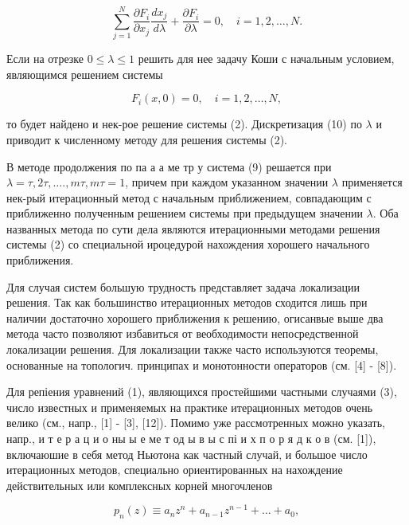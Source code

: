 \documentclass[10pt]{article}
\begin{document}
\[

\sum_{j=1}^{N} \frac{\partial F_{i}}{\partial x_{j}} \frac{d x_{j}}{d \lambda}+\frac{\partial F_{i}}{\partial \lambda}=0, \quad i=1,2, \ldots, N .

\]



Если на отрезке $0 \leqslant \lambda \leqslant 1$ решить для нее задачу Коши с начальным условием, являющимся решением системы



\[

F_{i}(x, 0)=0, \quad i=1,2, \ldots, N,

\]



то будет найдено и нек-рое решение системы (2). Дискретизация (10) по $\lambda$ и приводит к численному методу для решения системы (2).



В методе продолжения по па а а ме тр у система (9) решается при $\lambda=\tau, 2 \tau, \ldots ., m \tau, m \tau=1$, причем при каждом указанном значении $\lambda$ применяется нек-рый итерационный метод с начальным приближением, совпадающим с приближенно полученным решением системы при предыдущем значении $\lambda$. Оба названных метода по сути дела являются итерационными методами решения системы (2) со специальной ироцедурой нахождения хорошего начального приближения.



Для случая систем большую трудность представляет задача локализации решения. Так как большинство итерационных методов сходится лишь при наличии достаточно хорошего приближения к решению, огисанвые выше два метода часто позволяют избавиться от веобходимости непосредственной локализации решения. Для локализации также часто используются теоремы, основанные на топологич. принципах и монотонности операторов (см. [4] - [8]).



Для репіения уравнений (1), являющихся простейшими частными случаями (3), число известных и применяемых на практике итерационных методов очень велико (см., напр., [1] - [3], [12]). Помимо уже рассмотренных можно указать, напр., и т е р а ц и о ны ы е ме т од ы в ы с пі и х п о р я д к о в (см. [1]), включаюшие в себя метод Ньютона как частный случай, и большое число итерационных методов, специально ориентированных на нахождение действительных или комплексных корней многочленов



\[

p_{n}(z) \equiv a_{n} z^{n}+a_{n-1} z^{n-1}+\ldots+a_{0},

\]
\end{document}
